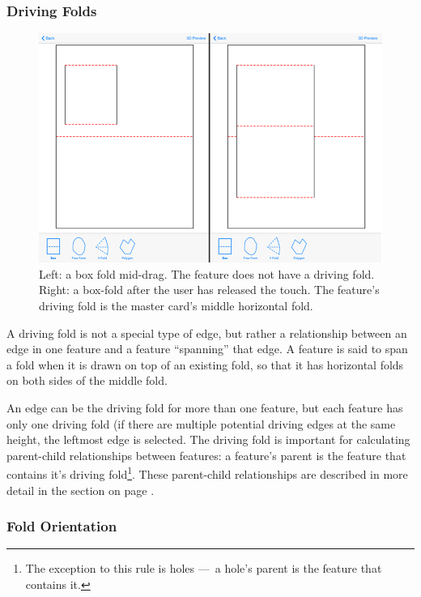 \subsubsection{Driving Folds}\label{driving-folds}

\begin{figure}[htbp]
\centering
\includegraphics{figures/33_UI_Interface_Data_Structures/boxfold_driving_non_driving.png}
\caption{Left: a box fold mid-drag. The feature does not have a driving
fold. Right: a box-fold after the user has released the touch. The
feature's driving fold is the master card's middle horizontal fold.}
\end{figure}

A driving fold is not a special type of edge, but rather a relationship
between an edge in one feature and a feature ``spanning'' that edge. A
feature is said to span a fold when it is drawn on top of an existing
fold, so that it has horizontal folds on both sides of the middle fold.

An edge can be the driving fold for more than one feature, but each
feature has only one driving fold (if there are multiple potential
driving edges at the same height, the leftmost edge is selected. The
driving fold is important for calculating parent-child relationships
between features: a feature's parent is the feature that contains it's
driving fold\footnote{The exception to this rule is holes ---~a hole's
  parent is the feature that contains it.}. These parent-child
relationships are described in more detail in the
 section on page \pageref{nested-features}.

\subsubsection{Fold Orientation}\label{fold-orientation}


